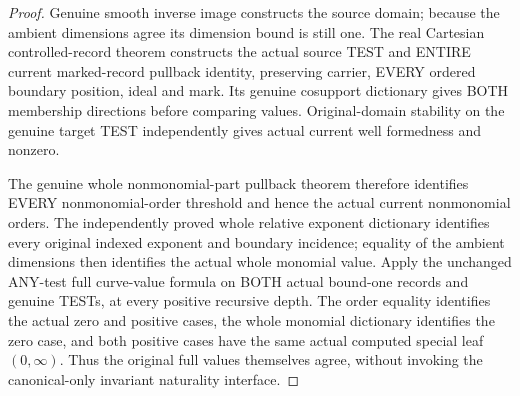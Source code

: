 \begin{proof}
Genuine smooth inverse image constructs the source domain; because the
ambient dimensions agree its dimension bound is still one. The real
Cartesian controlled-record theorem constructs the actual source TEST
and ENTIRE current marked-record pullback identity, preserving carrier,
EVERY ordered boundary position, ideal and mark. Its genuine cosupport
dictionary gives BOTH membership directions before comparing values.
Original-domain stability on the genuine target TEST independently gives
actual current well formedness and nonzero.

The genuine whole nonmonomial-part pullback theorem therefore identifies
EVERY nonmonomial-order threshold and hence the actual current
nonmonomial orders. The independently proved whole relative exponent
dictionary identifies every original indexed exponent and boundary
incidence; equality of the ambient dimensions then identifies the actual
whole monomial value. Apply the unchanged ANY-test full curve-value
formula on BOTH actual bound-one records and genuine TESTs, at every
positive recursive depth. The order equality identifies the actual zero
and positive cases, the whole monomial dictionary identifies the zero
case, and both positive cases have the same actual computed special leaf
$(0,\infty)$. Thus the original full values themselves agree, without
invoking the canonical-only invariant naturality interface.
\end{proof}

